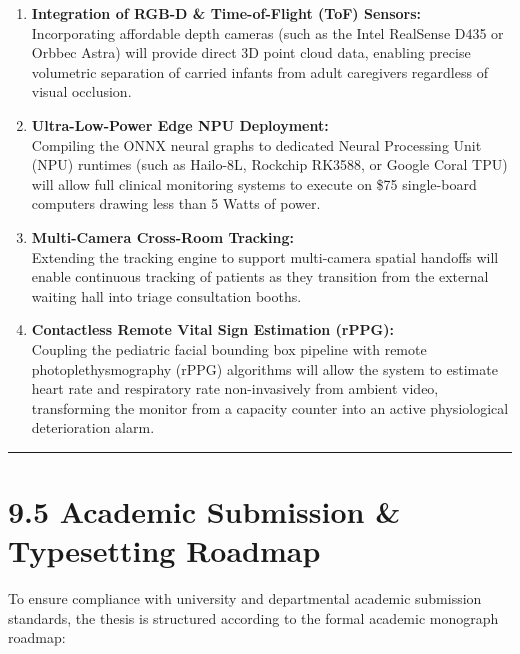 \begin{enumerate}
\def\labelenumi{\arabic{enumi}.}
\tightlist
\item
  \textbf{Integration of RGB-D \& Time-of-Flight (ToF) Sensors:}\\
  Incorporating affordable depth cameras (such as the Intel RealSense
  D435 or Orbbec Astra) will provide direct 3D point cloud data,
  enabling precise volumetric separation of carried infants from adult
  caregivers regardless of visual occlusion.
\item
  \textbf{Ultra-Low-Power Edge NPU Deployment:}\\
  Compiling the ONNX neural graphs to dedicated Neural Processing Unit
  (NPU) runtimes (such as Hailo-8L, Rockchip RK3588, or Google Coral
  TPU) will allow full clinical monitoring systems to execute on \$75
  single-board computers drawing less than 5 Watts of power.
\item
  \textbf{Multi-Camera Cross-Room Tracking:}\\
  Extending the tracking engine to support multi-camera spatial handoffs
  will enable continuous tracking of patients as they transition from
  the external waiting hall into triage consultation booths.
\item
  \textbf{Contactless Remote Vital Sign Estimation (rPPG):}\\
  Coupling the pediatric facial bounding box pipeline with remote
  photoplethysmography (rPPG) algorithms will allow the system to
  estimate heart rate and respiratory rate non-invasively from ambient
  video, transforming the monitor from a capacity counter into an active
  physiological deterioration alarm.
\end{enumerate}

\begin{center}\rule{0.5\linewidth}{0.5pt}\end{center}

\section{9.5 Academic Submission \& Typesetting
Roadmap}\label{academic-submission-typesetting-roadmap}

To ensure compliance with university and departmental academic
submission standards, the thesis is structured according to the formal
academic monograph roadmap:

